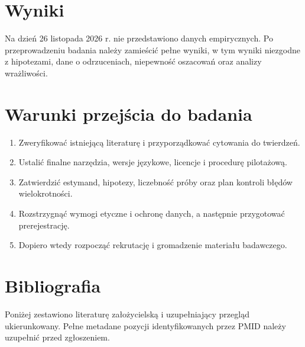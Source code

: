 \documentclass[11pt,a4paper]{article}
\begin{document}
\section{Wyniki}
Na dzień 26 listopada 2026 r. nie przedstawiono danych empirycznych. Po przeprowadzeniu badania należy zamieścić pełne wyniki, w tym wyniki niezgodne z hipotezami, dane o odrzuceniach, niepewność oszacowań oraz analizy wrażliwości.
\section{Warunki przejścia do badania}
\begin{enumerate}
\item Zweryfikować istniejącą literaturę i przyporządkować cytowania do twierdzeń.
\item Ustalić finalne narzędzia, wersje językowe, licencje i procedurę pilotażową.
\item Zatwierdzić estymand, hipotezy, liczebność próby oraz plan kontroli błędów wielokrotności.
\item Rozstrzygnąć wymogi etyczne i ochronę danych, a następnie przygotować prerejestrację.
\item Dopiero wtedy rozpocząć rekrutację i gromadzenie materiału badawczego.
\end{enumerate}
\section*{Bibliografia}
Poniżej zestawiono literaturę założycielską i uzupełniający przegląd ukierunkowany. Pełne metadane pozycji identyfikowanych przez PMID należy uzupełnić przed zgłoszeniem.
\end{document}
